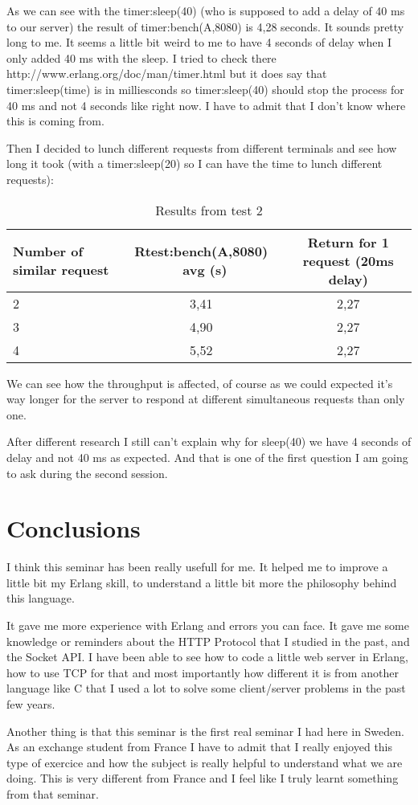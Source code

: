 \documentclass[a4paper, 11pt]{article}
\begin{document}
\newline
\newline
As we can see with the timer:sleep(40) (who is supposed to add a delay of 40 ms to our server) the result of timer:bench(A,8080) is 4,28 seconds. It sounds pretty long to me.
It seems a little bit weird to me to have 4 seconds of delay when I only added 40 ms with the sleep. I tried to check there http://www.erlang.org/doc/man/timer.html but it does say that timer:sleep(time) is in milliesconds so timer:sleep(40) should stop the process for 40 ms and not 4 seconds like right now. I have to admit that I don't know where this is coming from.

Then I decided to lunch different requests from different terminals and see how long it took (with a timer:sleep(20) so I can have the time to lunch different requests):

\begin{table}[h]
\centering
\begin{tabular}{lcc}
Number of similar request & Rtest:bench(A,8080) ~avg (s) & Return for 1 request (20ms delay)  \\\hline
2 & 3,41 & 2,27 \\\hline
3 & 4,90 & 2,27 \\\hline
4 & 5,52 & 2,27 \\\hline
\end{tabular}
\caption{Results from test 2}
\label{tab:results}
\end{table}

We can see how the throughput is affected, of course as we could expected it's way longer for the server to respond at different simultaneous requests than only one. 

After different research I still can't explain why for sleep(40) we have 4 seconds of delay and not 40 ms as expected. And that is one of the first question I am going to ask during the second session.

\newpage

\section{Conclusions}
 
I think this seminar has been really usefull for me. It helped me to improve a little bit my Erlang skill, to understand a little bit more the philosophy behind this language. 

It gave me more experience with Erlang and errors you can face. It gave me some knowledge or reminders about the HTTP Protocol that I studied in the past, and the Socket API. I have been able to see how to code a little web server in Erlang, how to use TCP for that and most importantly how different it is from another language like C that I used a lot to solve some client/server problems in the past few years.

Another thing is that this seminar is the first real seminar I had here in Sweden. As an exchange student from France I have to admit that I really enjoyed this type of exercice and how the subject is really helpful to understand what we are doing. This is very different from France and I feel like I truly learnt something from that seminar. 
\end{document}
